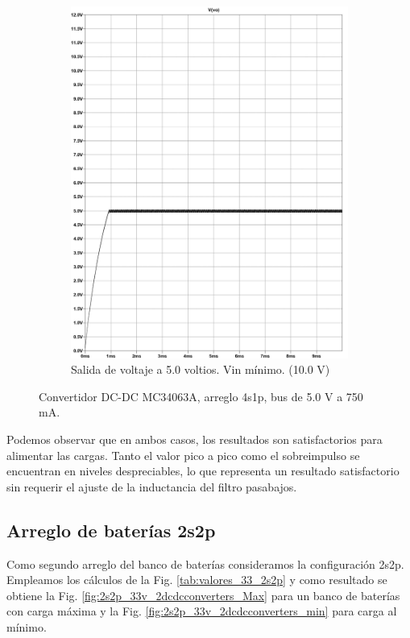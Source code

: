 \begin{figure}[h]
\begin{subfigure}{0.48\linewidth}
    \includegraphics[width=\textwidth]{Pictures/Convertidor DC-DC MC34063A, bus 5.0 v a 750 mA_page-0001 Min.jpg}
    \caption{Salida de voltaje a 5.0 voltios. Vin mínimo. (10.0 V)}
    \label{fig:4s1p_50v_2dcdcconverters_min}
  \end{subfigure}
  \caption{Convertidor DC-DC MC34063A, arreglo 4s1p, bus de 5.0 V a 750 mA.}
\end{figure}

Podemos observar que en ambos casos, los resultados son satisfactorios para alimentar las cargas. Tanto el valor pico a pico como el sobreimpulso se encuentran en niveles despreciables, lo que representa un resultado satisfactorio sin requerir el ajuste de la inductancia del filtro pasabajos.




\subsection{Arreglo de baterías 2s2p}
Como segundo arreglo del banco de baterías consideramos la configuración 2s2p. Empleamos los cálculos de la Fig. \ref{tab:valores_33_2s2p} y como resultado se obtiene la Fig. \ref{fig:2s2p_33v_2dcdcconverters_Max} para un banco de baterías con carga máxima y la Fig. \ref{fig:2s2p_33v_2dcdcconverters_min} para carga al mínimo.

